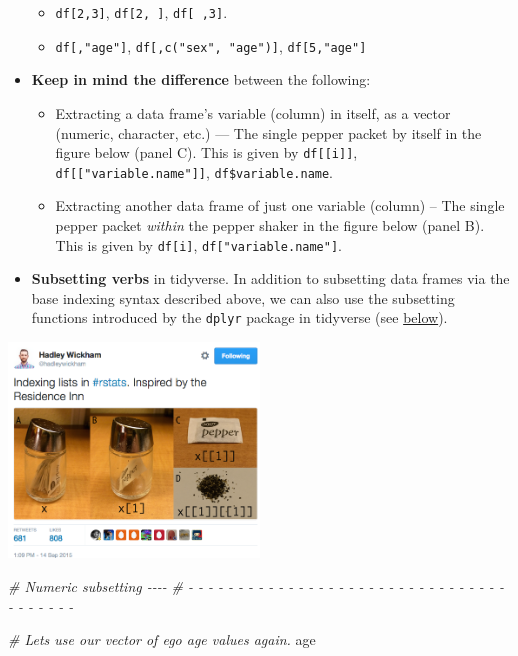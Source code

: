 \documentclass[
]{book}
\newenvironment{Shaded}{\begin{snugshade}}{\end{snugshade}}
\newcommand{\CommentTok}[1]{\textcolor[rgb]{0.56,0.35,0.01}{\textit{#1}}}
\newcommand{\NormalTok}[1]{#1}
\providecommand{\tightlist}{%
  \setlength{\itemsep}{0pt}\setlength{\parskip}{0pt}}
\begin{document}
\begin{itemize}
  \begin{itemize}
  \tightlist
  \item
    \texttt{df{[}2,3{]}}, \texttt{df{[}2,\ {]}}, \texttt{df{[}\ ,3{]}}.
  \item
    \texttt{df{[},"age"{]}}, \texttt{df{[},c("sex",\ "age"){]}}, \texttt{df{[}5,"age"{]}}
  \end{itemize}
\item
  \textbf{Keep in mind the difference} between the following:

  \begin{itemize}
  \tightlist
  \item
    Extracting a data frame's variable (column) in itself, as a vector (numeric, character, etc.) --- The single pepper packet by itself in the figure below (panel C). This is given by \texttt{df{[}{[}i{]}{]}}, \texttt{df{[}{[}"variable.name"{]}{]}}, \texttt{df\$variable.name}.
  \item
    Extracting another data frame of just one variable (column) -- The single pepper packet \emph{within} the pepper shaker in the figure below (panel B). This is given by \texttt{df{[}i{]}}, \texttt{df{[}"variable.name"{]}}.
  \end{itemize}
\item
  \textbf{Subsetting verbs} in tidyverse. In addition to subsetting data frames via the base indexing syntax described above, we can also use the subsetting functions introduced by the \texttt{dplyr} package in tidyverse (see \protect\hyperlink{the-tidyverse-syntax}{below}).
\end{itemize}

\href{https://twitter.com/hadleywickham/status/643381054758363136?lang=en}{\includegraphics[width=0.5\textwidth,height=\textheight]{./Figures/wickham_indexing_tweet.png}}

\begin{Shaded}
\begin{Highlighting}[]
\CommentTok{\# Numeric subsetting                                                          {-}{-}{-}{-}}
\CommentTok{\# {-} {-} {-} {-} {-} {-} {-} {-} {-} {-} {-} {-} {-} {-} {-} {-} {-} {-} {-} {-} {-} {-} {-} {-} {-} {-} {-} {-} {-} {-} {-} {-} {-} {-} {-} {-} {-} {-} {-} }

\CommentTok{\# Let\textquotesingle{}s use our vector of ego age values again.}
\NormalTok{age}
\end{Highlighting}
\end{Shaded}
\end{document}
